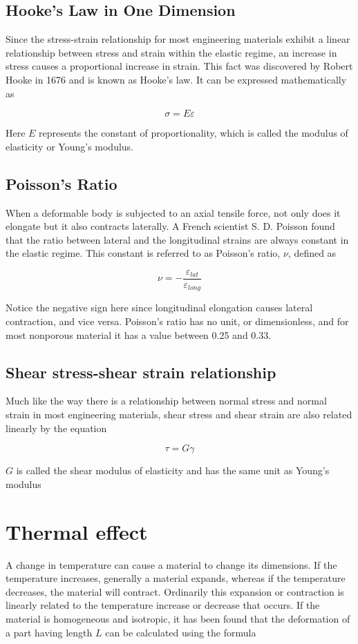 \documentclass[a4paper,openany,12pt]{book}
\begin{document}
\subsection{Hooke's Law in One Dimension}
\label{hookes-law-in-one-dimension}
Since the stress-strain relationship for most engineering materials
exhibit a linear relationship between stress and strain within the
elastic regime, an increase in stress causes a proportional increase in
strain. This fact was discovered by Robert Hooke in 1676 and is known as
Hooke's law. It can be expressed mathematically as

$$\sigma  = E\varepsilon$$

Here \(E\) represents the constant of proportionality, which is called the
modulus of elasticity or Young's modulus.

\subsection{Poisson's Ratio}
\label{poissons-ratio}
When a deformable body is subjected to an axial tensile force, not only
does it elongate but it also contracts laterally. A French scientist S.
D. Poisson found that the ratio between lateral and the longitudinal
strains are always constant in the elastic regime. This constant is
referred to as Poisson's ratio, \(\nu\), defined as


$$\nu  =  - \frac{\varepsilon _{lat}}{\varepsilon _{long}}$$

Notice the negative sign here since longitudinal elongation causes
lateral contraction, and vice versa. Poisson's ratio has no unit, or
dimensionless, and for most nonporous material it has a value between
0.25 and 0.33.

\subsection{Shear stress-shear strain relationship}
\label{shear-stress-shear-strain-relationship}
Much like the way there is a relationship between normal stress and
normal strain in most engineering materials, shear stress and shear
strain are also related linearly by the equation

$$\tau  = G\gamma$$

\(G\) is called the shear modulus of elasticity and has the same unit as
Young's modulus

\section{Thermal effect}
\label{thermal-effect}
A change in temperature can cause a material to change its dimensions.
If the temperature increases, generally a material expands, whereas if
the temperature decreases, the material will contract. Ordinarily this
expansion or contraction is linearly related to the temperature increase
or decrease that occurs. If the material is homogeneous and isotropic,
it has been found that the deformation of a part having length \(L\) can
be calculated using the formula
\end{document}
